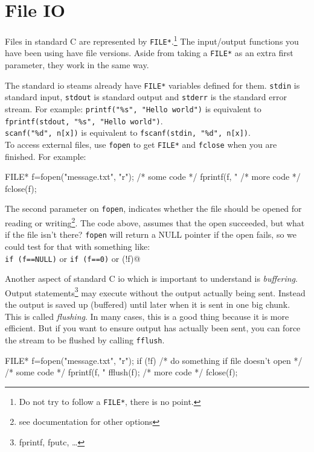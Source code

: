 
\chapter{File IO}

Files in standard C are represented by \texttt{FILE*}.\footnote{Do not try to follow a \texttt{FILE*}, there is no point.}
The input/output functions you have been using have file versions.
Aside from taking a \texttt{FILE*} as an extra first parameter, they work in the same way.

The standard io steams already have \texttt{FILE*} variables defined for them.
\texttt{stdin} is standard input, \texttt{stdout} is standard output and \texttt{stderr} is the standard error stream. 
For example:
\lstinline!printf("%s", "Hello world")! is equivalent to \lstinline!fprintf(stdout, "%s", "Hello world")!.\\
\lstinline!scanf("%d", n[x])! is equivalent to \lstinline!fscanf(stdin, "%d", n[x])!.\\

To access external files, use \texttt{fopen} to get \texttt{FILE*} and \texttt{fclose} when you are finished.
For example:
\begin{codeinline}
FILE* f=fopen("message.txt", "r");
/* some code */
fprintf(f, "%
/* more code */
fclose(f);
\end{codeinline}
The second parameter on \texttt{fopen}, indicates whether the file should be opened for reading or writing\footnote{see documentation for other options}.
The code above, assumes that the open succeeded, but what if the file isn't there?
\texttt{fopen} will return a NULL pointer if the open fails, so we could test for that with something like:\\
\lstinline!if (f==NULL)! or \lstinline!if (f==0)! or \lstinline@if (!f)@

Another aspect of standard C io which is important to understand is \emph{buffering}.
Output statements\footnote{fprintf, fputc, \ldots} may execute without the output actually being sent.
Instead the output is saved up (buffered) until later when it is sent in one big chunk.
This is called \emph{flushing}.
In many cases, this is a good thing because it is more efficient.
But if you want to ensure output has actually been sent, you can force the stream to be flushed by calling \texttt{fflush}.
\begin{codeinline}
FILE* f=fopen("message.txt", "r");
if (!f) {
    /* do something if file doesn't open */
}
/* some code */
fprintf(f, "%
fflush(f);
/* more code */
fclose(f);
\end{codeinline}

